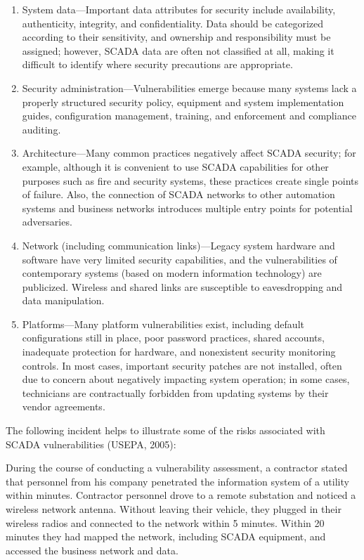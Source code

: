 \documentclass{article}
\begin{document}
\begin{enumerate}
\def\labelenumi{\arabic{enumi}.}
\tightlist
\item
  System data---Important data attributes for security include
  availability, authenticity, integrity, and confidentiality. Data
  should be categorized according to their sensitivity, and ownership
  and responsibility must be assigned; however, SCADA data are often not
  classified at all, making it difficult to identify where security
  precautions are appropriate.
\item
  Security administration---Vulnerabilities emerge because many systems
  lack a properly structured security policy, equipment and system
  implementation guides, configuration management, training, and
  enforcement and compliance auditing.
\item
  Architecture---Many common practices negatively affect SCADA security;
  for example, although it is convenient to use SCADA capabilities for
  other purposes such as fire and security systems, these practices
  create single points of failure. Also, the connection of SCADA
  networks to other automation systems and business networks introduces
  multiple entry points for potential adversaries.
\item
  Network (including communication links)---Legacy system hardware and
  software have very limited security capabilities, and the
  vulnerabilities of contemporary systems (based on modern information
  technology) are publicized. Wireless and shared links are susceptible
  to eavesdropping and data manipulation.
\item
  Platforms---Many platform vulnerabilities exist, including default
  configurations still in place, poor password practices, shared
  accounts, inadequate protection for hardware, and nonexistent security
  monitoring controls. In most cases, important security patches are not
  installed, often due to concern about negatively impacting system
  operation; in some cases, technicians are contractually forbidden from
  updating systems by their vendor agreements.
\end{enumerate}

The following incident helps to illustrate some of the risks associated
with SCADA vulnerabilities (USEPA, 2005):

During the course of conducting a vulnerability assessment, a contractor
stated that personnel from his company penetrated the information system
of a utility within minutes. Contractor personnel drove to a remote
substation and noticed a wireless network antenna. Without leaving their
vehicle, they plugged in their wireless radios and connected to the
network within 5 minutes. Within 20 minutes they had mapped the network,
including SCADA equipment, and accessed the business network and data.
\end{document}
